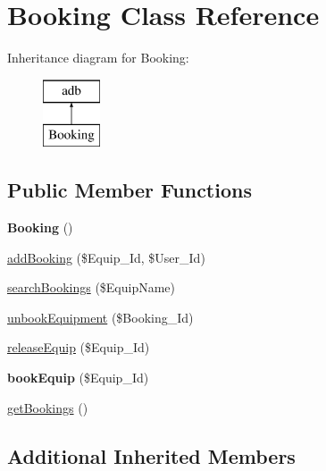 \hypertarget{class_booking}{}\section{Booking Class Reference}
\label{class_booking}
Inheritance diagram for Booking\+:\begin{figure}[H]
\begin{center}
\leavevmode
\includegraphics[height=2.000000cm]{class_booking}
\end{center}
\end{figure}
\subsection*{Public Member Functions}
\begin{DoxyCompactItemize}
\item 
{\bfseries Booking} ()\hypertarget{class_booking_a1e9a6bc6b4531385afaa068510394c10}{}\label{class_booking_a1e9a6bc6b4531385afaa068510394c10}

\item 
\hyperlink{class_booking_a926356c5cf1148e86b384c975e979a70}{add\+Booking} (\$Equip\+\_\+\+Id, \$User\+\_\+\+Id)
\item 
\hyperlink{class_booking_a4a891c8631da9e436cbfa3dc5a1af870}{search\+Bookings} (\$Equip\+Name)
\item 
\hyperlink{class_booking_a53c9c60dc2d5200976f52594175dc1eb}{unbook\+Equipment} (\$Booking\+\_\+\+Id)
\item 
\hyperlink{class_booking_ab79fef06fab5b9b19312651cf8ad79f5}{release\+Equip} (\$Equip\+\_\+\+Id)
\item 
{\bfseries book\+Equip} (\$Equip\+\_\+\+Id)\hypertarget{class_booking_a0fd3d89691c5f2391a7fa082ceb8cd01}{}\label{class_booking_a0fd3d89691c5f2391a7fa082ceb8cd01}

\item 
\hyperlink{class_booking_a3dba7af3ac89f0c7c191024c2bcbf2e5}{get\+Bookings} ()
\end{DoxyCompactItemize}
\subsection*{Additional Inherited Members}


